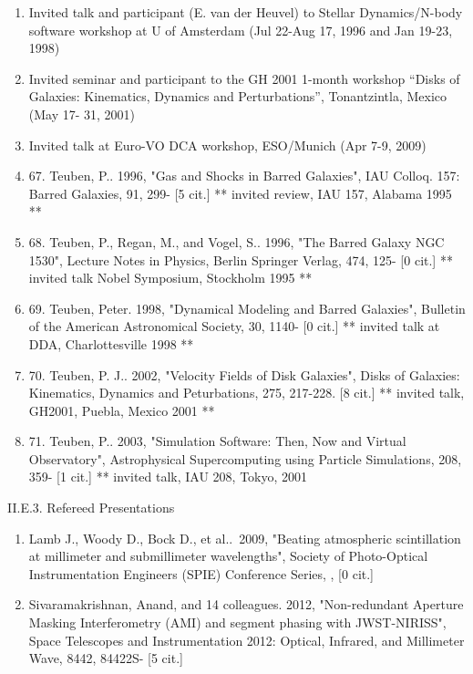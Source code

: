 \documentclass[11pt,letterpaper]{article}
\begin{document}
\begin{enumerate}[resume,label=\textbf{\arabic*}.]  
\item
Invited talk and participant (E. van der Heuvel) to Stellar
Dynamics/N-body software workshop at U of Amsterdam (Jul 22-Aug 17,
1996 and Jan 19-23, 1998)

\item
Invited seminar and participant to the GH 2001 1-month workshop
``Disks of Galaxies:  Kinematics, Dynamics and Perturbations'',
Tonantzintla, Mexico (May 17-			31, 2001)

\item
Invited talk at Euro-VO DCA workshop, ESO/Munich (Apr 7-9, 2009)  

\item
67. Teuben, P..  1996,  "Gas and Shocks in Barred Galaxies",
IAU Colloq. 157: Barred Galaxies,  91,  299- [5 cit.]
** invited review, IAU 157, Alabama 1995 **

\item
68. Teuben, P., Regan, M., and Vogel, S..  1996,
"The Barred Galaxy NGC 1530", Lecture Notes in Physics, Berlin Springer Verlag,  474,  125- [0 cit.]
** invited talk Nobel Symposium, Stockholm 1995 **

\item
69. Teuben, Peter.  1998,  "Dynamical Modeling and Barred Galaxies",
Bulletin of the American Astronomical Society,  30,  1140- [0 cit.]
** invited talk at DDA, Charlottesville 1998 **

\item
70. Teuben, P. J..  2002,
"Velocity Fields of Disk Galaxies", Disks of Galaxies: Kinematics, Dynamics and Peturbations,  275,  217-228.  [8 cit.]
** invited talk, GH2001, Puebla, Mexico 2001 **

\item
71. Teuben, P..  2003,
"Simulation Software: Then, Now and Virtual Observatory",
Astrophysical Supercomputing using Particle Simulations,  208,  359- [1 cit.]
** invited talk, IAU 208, Tokyo, 2001
\end{enumerate}

II.E.3. Refereed Presentations


\begin{enumerate}[resume,label=\textbf{\arabic*}.]
\item  Lamb J., Woody D., Bock D., et al..\  2009,  "Beating atmospheric 
scintillation at millimeter and submillimeter wavelengths", Society of 
Photo-Optical Instrumentation Engineers (SPIE) Conference Series,  ,  [0 cit.] %

\item
Sivaramakrishnan, Anand, and 14 colleagues.  2012, "Non-redundant
Aperture Masking Interferometry (AMI) and segment phasing with
JWST-NIRISS", Space Telescopes and Instrumentation 2012: Optical,
Infrared, and Millimeter Wave, 8442, 84422S- [5 cit.]

\end{enumerate}
\end{document}
